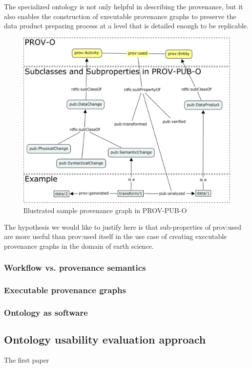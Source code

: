 The specialized ontology is not only helpful in describing the provenance, but it also enables the construction of executable provenance graphs to preserve the data product preparing process at a level that is detailed enough to be replicable.

\begin{figure}
	\includegraphics[width=\textwidth]{prov-pub-o.png}
	\caption{Illustrated sample provenance graph in PROV-PUB-O }
\end{figure}

The hypothesis we would like to justify here is that sub-properties of prov:used are more useful than prov:used itself in the use case of creating executable provenance graphs in the domain of earth science.

\subsubsection{Workflow vs. provenance semantics}

\subsubsection{Executable provenance graphs}

\subsubsection{Ontology as software}

\subsection{Ontology usability evaluation approach}
\label{subsec:evaluation}
The first paper \cite{gruninger1995methodology} 


